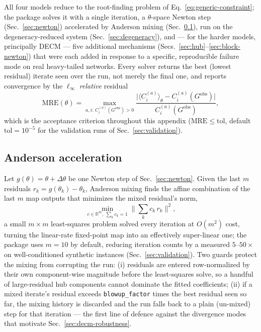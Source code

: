 \documentclass[10pt]{article}
\newcommand{\R}{\mathbb{R}}
\begin{document}
All four models reduce to the root-finding problem of
Eq.~\ref{eq:generic-constraint}; the package solves it with a single
iteration, a $\theta$-space Newton step (Sec.~\ref{sec:newton})
accelerated by Anderson mixing (Sec.~\ref{sec:anderson}), run on the degeneracy-reduced system
(Sec.~\ref{sec:degeneracy}), and --- for the harder models, principally
DECM --- five additional mechanisms (Secs.~\ref{sec:hub}--\ref{sec:block-newton})
that were each added in response to a specific, reproducible failure mode
on real heavy-tailed networks. Every solver returns the best (lowest
residual) iterate seen over the run, not merely the final one, and reports
convergence by the $\ell_\infty$ \emph{relative} residual
\begin{equation}
\mathrm{MRE}(\theta) = \max_{a,i:\,C^{(a)}_i(G^{\mathrm{obs}})>0}
\frac{\big|\langle C^{(a)}_i\rangle_\theta - C^{(a)}_i(G^{\mathrm{obs}})\big|}{C^{(a)}_i(G^{\mathrm{obs}})},
\end{equation}
which is the acceptance criterion throughout this appendix
($\mathrm{MRE}\le\mathrm{tol}$, default $\mathrm{tol}=10^{-5}$ for the
validation runs of Sec.~\ref{sec:validation}).

\subsection{Anderson acceleration}
\label{sec:anderson}

Let $g(\theta)=\theta+\Delta\theta$ be one Newton step of Sec.~\ref{sec:newton}. Given the last $m$ residuals $r_k = g(\theta_k)-\theta_k$, Anderson mixing finds the affine
combination of the last $m$ map outputs that minimizes the mixed
residual's norm,
\begin{equation}
\min_{c\in\R^m,\ \sum_k c_k = 1} \Big\| \sum_k c_k\, r_k \Big\|^2,
\end{equation}
a small $m\times m$ least-squares problem solved every iteration at
$O(m^2)$ cost, turning the linear-rate fixed-point map into an
effectively super-linear one; the package uses $m=10$ by default,
reducing iteration counts by a measured $5$--$50\times$ on well-conditioned
synthetic instances (Sec.~\ref{sec:validation}). Two guards protect the
mixing from corrupting the run: (i) residuals are entered row-normalized
by their own component-wise magnitude before the least-squares solve, so a
handful of large-residual hub components cannot dominate the fitted
coefficients; (ii) if a mixed iterate's residual exceeds
\texttt{blowup\_factor} times the best residual seen so far, the mixing
history is discarded and the run falls back to a plain (un-mixed) step for
that iteration --- the first line of defence against the divergence modes
that motivate Sec.~\ref{sec:decm-robustness}.
\end{document}
